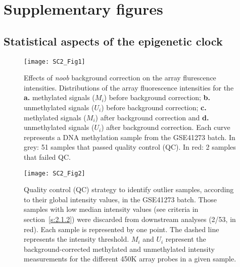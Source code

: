 
\setcounter{chapter}{-1}

\chapter[]{Supplementary figures} 

\ifpdf
\graphicspath{{Appendix/Figs/pdf/}}
\else
\graphicspath{{Appendix/Figs/svg/}}
\fi

\renewcommand{\thesection}{S.1}   
\section{Statistical aspects of the epigenetic clock}

\renewcommand\thefigure{S1.\arabic{figure}}    

\begin{figure}[htbp!] 
	\centering    
	\setcounter{figure}{0}
	\texttt{[image: SC2\_Fig1]}
	\caption[Effects of \textit{noob} background correction on the array fluorescence intensities.]{Effects of \textit{noob} background correction on the array flurescence intensities. Distributions of the array fluorescence intensities for the \textbf{a.} methylated signals ($M_{i}$) before background correction; \textbf{b.} unmethylated signals ($U_{i}$) before background correction; \textbf{c.} methylated signals ($M_{i}$) after background correction and \textbf{d.} unmethylated signals ($U_{i}$) after background correction. Each curve represents a DNA methylation sample from the GSE41273 batch. In grey: 51 samples that passed quality control (QC). In red: 2 samples that failed QC.}
	\label{fig:sc2_fig1}
\end{figure}

\begin{figure}[htbp!] 
	\centering    
	\texttt{[image: SC2\_Fig2]}
	\caption[Quality control (QC) strategy to identify outlier samples.]{Quality control (QC) strategy to identify outlier samples, according to their global intensity values, in the GSE41273 batch. Those samples with low median intensity values (see criteria in section~\ref{s:2.1.2}) were discarded from downstream analyses (2/53, in red). Each sample is represented by one point. The dashed line represents the  intensity threshold. $M_{i}$ and $U_{i}$ represent the background-corrected methylated and unmethylated intensity measurements for the different 450K array probes in a given sample.}
	\label{fig:sc2_fig2}
\end{figure}


